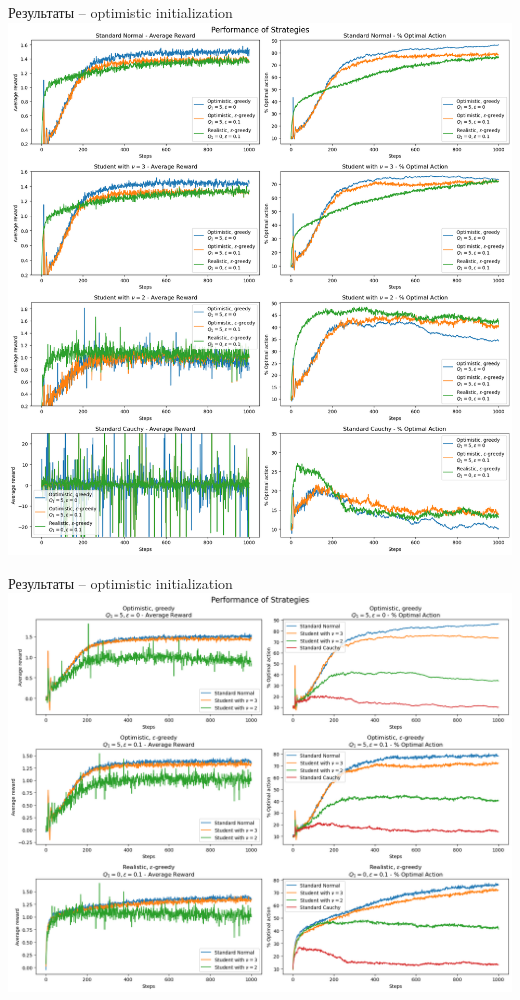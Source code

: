 \documentclass[11pt]{beamer} %
\begin{document}
    \begin{frame}{Результаты -- optimistic initialization}
        \includegraphics[scale=0.13,center]{images/bandit_tester/optimistic_1.png}
    \end{frame}
    \begin{frame}{Результаты -- optimistic initialization}
        \includegraphics[scale=0.13,center]{images/bandit_tester/optimistic_2.png}
    \end{frame}
\end{document}
